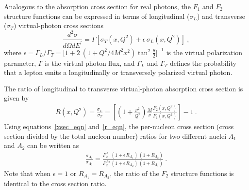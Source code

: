 Analogous to the absorption cross section for real photons, the $ F_1$ and $
F_2$ structure functions can be expressed in terms of longitudinal
($\sigma_L$) and transverse ($\sigma_T$) virtual-photon cross sections
%
\begin{equation}\label{rosenrxsec_eqn}
 \frac{d^2\sigma}{d\Omega dE^{'}} =
\Gamma \left[ \sigma_T \left( x, Q^2\right) +
\epsilon \, \sigma_L \left( x, Q^2\right) \right]~,
\end{equation}
%
where $\epsilon =\Gamma_L/\Gamma_T= \big[1+2~(1+Q^2/4M^2x^2)
\tan^2\frac{\theta}2\big] ^{-1}$ is the virtual polarization parameter,
$\Gamma$ is the virtual photon flux, and $\Gamma_L$ and $\Gamma_T$ defines the
probability that a lepton emits a longitudinally or transversely polarized
virtual photon.


The ratio of longitudinal to transverse virtual-photon absorption cross
section is given by
%
\begin{eqnarray} \label{r_eqn}
R(x,Q^2) = \frac{\sigma_L}{\sigma_T} = \left[ \left(1+\frac{\nu^2}{Q^2} \right)
\frac{M}{\nu} \frac{F_2(x,Q^2) }{F_1(x,Q^2) }\right]-1 ~.
\end{eqnarray}
%
Using equations~\ref{xsec_eqn} and~\ref{r_eqn}, the per-nucleon cross section
(cross section divided by the total nucleon number) ratios for two different
nuclei $A_1$ and $A_2$ can be written as
%
\begin{eqnarray} 
\frac{\sigma_{A_1}}{\sigma_{A_2}} =
\frac{F_2^{A_1}\, (1+\epsilon \, R_ {A_1}) \, (1+ R_ {A_2}) }
     {F_2^{A_2}\, (1+\epsilon \, R_ {A_2}) \, (1+ R_ {A_1}) }~. 
\end{eqnarray}
%
Note that when $\epsilon =1$ or $R_{A_1} =R_{A_2}$, the ratio of the $F_2$
structure functions is identical to the cross section ratio.


